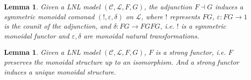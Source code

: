 \documentclass{article}
\newtheorem{lemma}[theorem]{Lemma}
\let\mto\to
\let\to\relax
\newcommand{\to}{\rightarrow}
\newcommand{\cat}[1]{\mathcal{#1}}
\begin{document}
\begin{lemma}
  \label{lem:comonad}
  Given a LNL model $(\cat{C},\cat{L},F,G)$, the adjunction
  $F\dashv G$ induces a symmetric monoidal comonad
  $(!,\varepsilon,\delta)$ on $\cat{L}$, where $!$ represents $FG$,
  $\varepsilon:FG\mto 1$ is the counit of the adjunction, and
  $\delta:FG\mto FGFG$, i.e. $!$ is a symmetric monoidal functor
  and $\varepsilon,\delta$ are monoidal natural transformations.
\end{lemma}

\begin{lemma}
  \label{def:strong-functor}
  Given a LNL model $(\cat{C},\cat{L},F,G)$, $F$ is a strong functor,
  i.e. $F$ preserves the monoidal structure up to an isomorphism. And
  a strong functor induces a unique monoidal structure.
\end{lemma}
\end{document}
